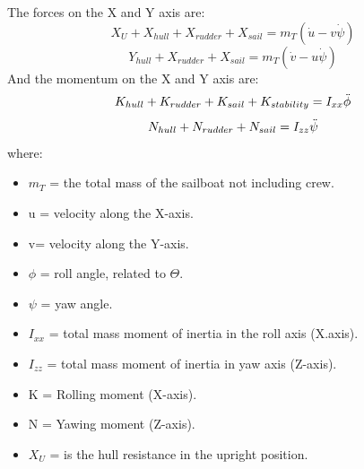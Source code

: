 
The forces on the X and Y axis are: \\  
\begin{equation}\label{eq:force_X_motion}
    X_{U}+X_{hull}+X_{rudder}+X_{sail}=m_{T}(\Dot{u}-v\Dot{\psi})
\end{equation}
\begin{equation}\label{eq:force_Y_motion}
    Y_{hull}+X_{rudder}+X_{sail}=m_{T}(\Dot{v}-u\Dot{\psi})
\end{equation}
And the momentum on the X and Y axis are: \\
\begin{equation}\label{eq:moment_X_motion}
    K_{hull}+K_{rudder}+K_{sail}+K_{stability}=I_{xx} \Ddot{\phi}
\end{equation}
\begin{equation}\label{eq:moment_Y_motion}
    N_{hull}+N_{rudder}+N_{sail}=I_{zz} \Ddot{\psi}
\end{equation}
where: 
\begin{itemize}  \label{symbols o motions}
 \setlength \itemsep{0em}
\item $m_{T}$ = the total mass of the sailboat not including crew.
\item u = velocity along the X-axis.
\item v= velocity along the Y-axis.
\item $\phi$ = roll angle, related to $\Theta$.
\item $\psi$ = yaw angle. %
\item $I_{xx}$ = total mass moment of inertia in the roll axis (X.axis).
\item $I_{zz}$ = total mass moment of inertia in yaw axis (Z-axis).
\item K = Rolling moment (X-axis).
\item N = Yawing moment (Z-axis).
\item $X_{U}$ = is the hull resistance in the upright position.
\end{itemize}

